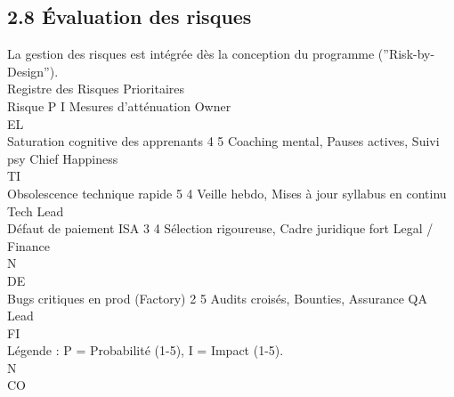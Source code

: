 \subsection{2.8 Évaluation des risques}
La gestion des risques est intégrée dès la conception du programme (”Risk-by-Design”).\\
\vspace{0.5em}
Registre des Risques Prioritaires\\
\vspace{0.5em}
\vspace{0.5em}
\vspace{0.5em}
Risque                                 P   I   Mesures d’atténuation                             Owner\\
\vspace{0.5em}
\vspace{0.5em}
\vspace{0.5em}
\vspace{0.5em}
EL\\
Saturation cognitive des apprenants    4   5   Coaching mental, Pauses actives, Suivi psy        Chief Happiness\\
\vspace{0.5em}
\vspace{0.5em}
\vspace{0.5em}
\vspace{0.5em}
TI\\
Obsolescence technique rapide          5   4   Veille hebdo, Mises à jour syllabus en continu    Tech Lead\\
Défaut de paiement ISA                 3   4   Sélection rigoureuse, Cadre juridique fort        Legal / Finance\\
\vspace{0.5em}
\vspace{0.5em}
\vspace{0.5em}
\vspace{0.5em}
N\\
DE\\
Bugs critiques en prod (Factory)       2   5   Audits croisés, Bounties, Assurance               QA Lead\\
\vspace{0.5em}
\vspace{0.5em}
\vspace{0.5em}
\vspace{0.5em}
FI\\
Légende : P = Probabilité (1-5), I = Impact (1-5).\\
\vspace{0.5em}
\vspace{0.5em}
\vspace{0.5em}
N\\
CO\\
